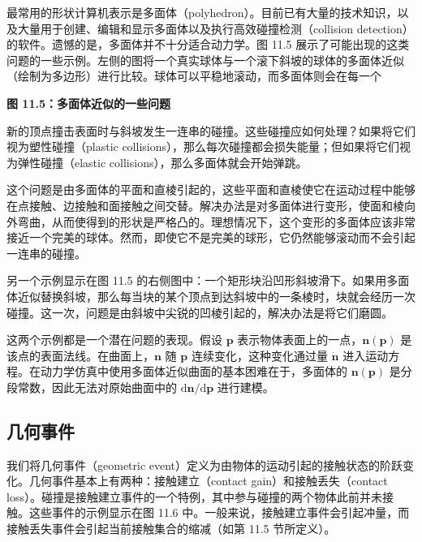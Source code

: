 \documentclass[10pt,a4paper]{book}
\theoremstyle{thmstyle} %
\theoremstyle{defstyle} %
\theoremstyle{prostyle} %
\begin{document}
最常用的形状计算机表示是多面体（polyhedron）。目前已有大量的技术知识，以及大量用于创建、编辑和显示多面体以及执行高效碰撞检测（collision detection）的软件。遗憾的是，多面体并不十分适合动力学。图 11.5 展示了可能出现的这类问题的一些示例。左侧的图将一个真实球体与一个滚下斜坡的球体的多面体近似（绘制为多边形）进行比较。球体可以平稳地滚动，而多面体则会在每一个



\noindent\textbf{图 11.5：多面体近似的一些问题}





新的顶点撞击表面时与斜坡发生一连串的碰撞。这些碰撞应如何处理？如果将它们视为塑性碰撞（plastic collisions），那么每次碰撞都会损失能量；但如果将它们视为弹性碰撞（elastic collisions），那么多面体就会开始弹跳。



这个问题是由多面体的平面和直棱引起的，这些平面和直棱使它在运动过程中能够在点接触、边接触和面接触之间交替。解决办法是对多面体进行变形，使面和棱向外弯曲，从而使得到的形状是严格凸的。理想情况下，这个变形的多面体应该非常接近一个完美的球体。然而，即使它不是完美的球形，它仍然能够滚动而不会引起一连串的碰撞。



另一个示例显示在图 11.5 的右侧图中：一个矩形块沿凹形斜坡滑下。如果用多面体近似替换斜坡，那么每当块的某个顶点到达斜坡中的一条棱时，块就会经历一次碰撞。这一次，问题是由斜坡中尖锐的凹棱引起的，解决办法是将它们磨圆。



这两个示例都是一个潜在问题的表现。假设 $\boldsymbol{p}$ 表示物体表面上的一点，$\boldsymbol{n}(\boldsymbol{p})$ 是该点的表面法线。在曲面上，$\boldsymbol{n}$ 随 $\boldsymbol{p}$ 连续变化，这种变化通过量 $\dot{\boldsymbol{n}}$ 进入运动方程。在动力学仿真中使用多面体近似曲面的基本困难在于，多面体的 $\boldsymbol{n}(\boldsymbol{p})$ 是分段常数，因此无法对原始曲面中的 $\mathrm{d}\boldsymbol{n}/\mathrm{d}\boldsymbol{p}$ 进行建模。



\subsection{几何事件}





我们将几何事件（geometric event）定义为由物体的运动引起的接触状态的阶跃变化。几何事件基本上有两种：接触建立（contact gain）和接触丢失（contact loss）。碰撞是接触建立事件的一个特例，其中参与碰撞的两个物体此前并未接触。这些事件的示例显示在图 11.6 中。一般来说，接触建立事件会引起冲量，而接触丢失事件会引起当前接触集合的缩减（如第 11.5 节所定义）。
\end{document}
